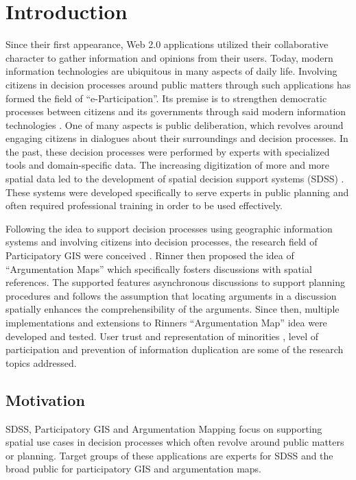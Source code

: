 \section{Introduction}
Since their first appearance, Web 2.0 applications utilized their collaborative character to gather information and opinions from their users. Today, modern information technologies are ubiquitous in many aspects of daily life. Involving citizens in decision processes around public matters through such applications has formed the field of ``e-Participation''. Its premise is to strengthen democratic processes between citizens and its governments through said modern information technologies \cite{Saebo_eParticipation, Medaglia2012_eParticipation}. One of many aspects is public deliberation, which revolves around engaging citizens in dialogues about their surroundings and decision processes. In the past, these decision processes were performed by experts with specialized tools and domain-specific data. The increasing digitization of more and more spatial data led to the development of spatial decision support systems (SDSS) \cite{densham_sdss}. These systems were developed specifically to serve experts in public planning and often required professional training in order to be used effectively.

Following the idea to support decision processes using geographic information systems and involving citizens into decision processes, the research field of Participatory GIS were conceived \cite{Macintosh2004_eParticipation_characterization,Sieber2006_PublicParticipationGIS}. Rinner then proposed the idea of ``Argumentation Maps'' \cite{Rinner_ArgumentationMaps} which specifically fosters discussions with spatial references. The supported features asynchronous discussions to support planning procedures and follows the assumption that locating arguments in a discussion spatially enhances the comprehensibility of the arguments. Since then, multiple implementations and extensions to Rinners ``Argumentation Map'' idea were developed and tested. User trust and representation of minorities \cite{Carver2001_PPGIS_Cyberdemocracy}, level of participation \cite{Steinmann2005_Combination_Ladder_GIS} and prevention of information duplication \cite{Hopfer2007_Communication} are some of the research topics addressed.

\subsection{Motivation}

SDSS, Participatory GIS and Argumentation Mapping focus on supporting spatial use cases in decision processes which often revolve around public matters or planning. Target groups of these applications are experts for SDSS and the broad public for participatory GIS and argumentation maps. 